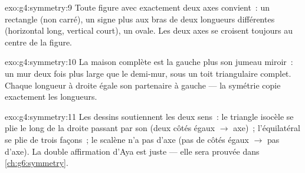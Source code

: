 \begin{solution}{exo:g4:symmetry:9}
Toute figure avec exactement deux axes convient~: un rectangle (non
carré), un signe plus aux bras de deux longueurs différentes
(horizontal long, vertical court), un ovale. Les deux axes se
croisent toujours au centre de la figure.
\end{solution}

\begin{solution}{exo:g4:symmetry:10}
La maison complète est la  gauche plus son jumeau miroir~: un
mur deux fois plus large que le demi-mur, sous un toit triangulaire
complet. Chaque longueur à droite égale son partenaire à gauche ---
la symétrie copie exactement les longueurs.
\end{solution}

\begin{solution}{exo:g4:symmetry:11}
Les dessins soutiennent les deux sens~: le triangle isocèle se plie
le long de la droite passant par son  (deux côtés égaux
$\to$ axe)~; l'équilatéral se plie de trois façons~; le scalène n'a
pas d'axe (pas de côtés égaux $\to$ pas d'axe). La double
affirmation d'Aya est juste --- elle sera prouvée dans
\cref{ch:g6:symmetry}.
\end{solution}

